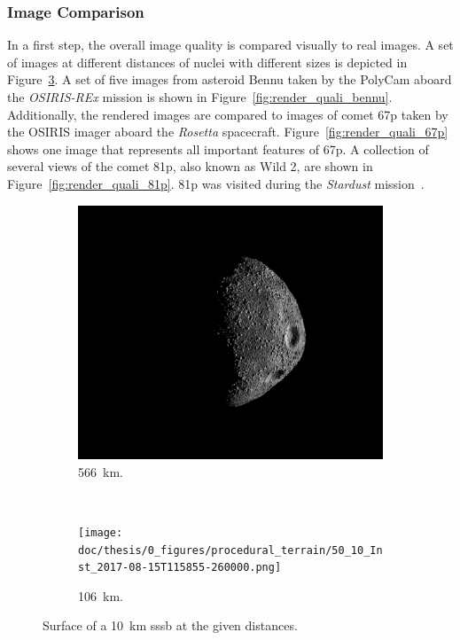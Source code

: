 \subsubsection{Image Comparison}
In a first step, the overall image quality is compared visually to real images. A set of images at different distances of nuclei with different sizes is depicted in Figure~\ref{fig:render_quali_comparison}. A set of five images from asteroid Bennu taken by the PolyCam aboard the \textit{OSIRIS-REx} mission is shown in Figure~\ref{fig:render_quali_bennu}. Additionally, the rendered images are compared to images of comet \gls{67p} taken by the OSIRIS imager aboard the \textit{Rosetta} spacecraft. Figure~\ref{fig:render_quali_67p} shows one image that represents all important features of \gls{67p}. A collection of several views of the comet \gls{81p}, also known as Wild 2, are shown in Figure~\ref{fig:render_quali_81p}. \Gls{81p} was visited during the \textit{Stardust} mission~\cite{Brownlee2003Stardust:Mission}.

\begin{figure}[htb]
    \centering
        \begin{subfigure}[b]{0.48\textwidth}
            \centering
                \includegraphics[width=\textwidth]{doc/thesis/0_figures/procedural_terrain/50_10_Inst_2017-08-15T115755-845000.png}
            \caption{\SI{566}{\kilo\meter}.}
            \label{fig:render_quali_comparison_1}
        \end{subfigure}
        \\
        \begin{subfigure}[b]{0.48\textwidth}
            \centering
                \texttt{[image: doc/thesis/0\_figures/procedural\_terrain/50\_10\_Inst\_2017-08-15T115855-260000.png]}
            \caption{\SI{106}{\kilo\meter}.}
            \label{fig:render_quali_comparison_2}
        \end{subfigure}
    \caption{Surface of a \SI{10}{\kilo\meter} \gls{sssb} at the given distances.}
    \label{fig:render_quali_comparison}
\end{figure}

